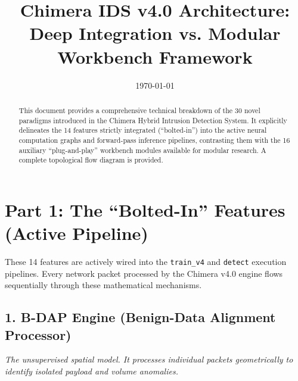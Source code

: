 \documentclass[11pt,a4paper]{article}
\title{\textbf{Chimera IDS v4.0 Architecture:}\\ \Large Deep Integration vs. Modular Workbench Framework}
\author{}
\date{\today}
\begin{document}
\maketitle

\begin{abstract}
This document provides a comprehensive technical breakdown of the 30 novel paradigms introduced in the Chimera Hybrid Intrusion Detection System. It explicitly delineates the 14 features strictly integrated (``bolted-in'') into the active neural computation graphs and forward-pass inference pipelines, contrasting them with the 16 auxiliary ``plug-and-play'' workbench modules available for modular research. A complete topological flow diagram is provided.
\end{abstract}

\vspace{0.5cm}

\section{Part 1: The ``Bolted-In'' Features (Active Pipeline)}
These 14 features are actively wired into the \texttt{train\_v4} and \texttt{detect} execution pipelines. Every network packet processed by the Chimera v4.0 engine flows sequentially through these mathematical mechanisms.

\subsection{1. B-DAP Engine (Benign-Data Alignment Processor)}
\textit{The unsupervised spatial model. It processes individual packets geometrically to identify isolated payload and volume anomalies.}
\end{document}

